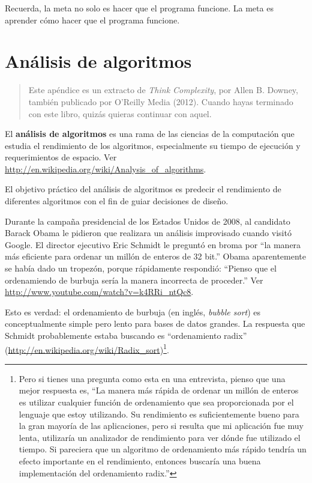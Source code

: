 \documentclass[10pt]{book}
\begin{document}
Recuerda, la meta no solo es hacer que el programa
funcione.  La meta es aprender cómo hacer que el programa funcione.


\chapter{Análisis de algoritmos}
\label{algorithms}

\begin{quote}
Este apéndice es un extracto de {\it Think Complexity}, por
Allen B. Downey, también publicado por O'Reilly Media (2012).  Cuando hayas
terminado con este libro, quizás quieras continuar con aquel.
\end{quote}

El {\bf análisis de algoritmos} es una rama de las ciencias de la computación que
estudia el rendimiento de los algoritmos, especialmente su tiempo de ejecución y
requerimientos de espacio.  Ver
\url{http://en.wikipedia.org/wiki/Analysis_of_algorithms}.
 

El objetivo práctico del análisis de algoritmos es predecir el rendimiento
de diferentes algoritmos con el fin de guiar decisiones de diseño.

Durante la campaña presidencial de los Estados Unidos de 2008, al candidato
Barack Obama le pidieron que realizara un análisis improvisado cuando
visitó Google.  El director ejecutivo Eric Schmidt le preguntó en broma
por ``la manera más eficiente para ordenar un millón de enteros de 32 bit.''
Obama aparentemente se había dado un tropezón, porque rápidamente
respondió: ``Pienso que el ordenamiendo de burbuja sería la manera incorrecta de proceder.''
Ver \url{http://www.youtube.com/watch?v=k4RRi_ntQc8}.

Esto es verdad: el ordenamiento de burbuja (en inglés, {\em bubble sort}) es conceptualmente simple pero lento
para bases de datos grandes.  La respuesta que Schmidt probablemente estaba buscando es
``ordenamiento radix'' (\url{http://en.wikipedia.org/wiki/Radix_sort})\footnote{
Pero si tienes una pregunta como esta en una entrevista, pienso que
una mejor respuesta es, ``La manera más rápida de ordenar un millón de enteros
es utilizar cualquier función de ordenamiento que sea proporcionada por el lenguaje
que estoy utilizando.  Su rendimiento es suficientemente bueno para la gran mayoría
de las aplicaciones, pero si resulta que mi aplicación fue muy
lenta, utilizaría un analizador de rendimiento para ver dónde fue utilizado
el tiempo.  Si pareciera que un algoritmo de ordenamiento más rápido tendría
un efecto importante en el rendimiento, entonces buscaría
una buena implementación del ordenamiento radix.''}.
\end{document}
